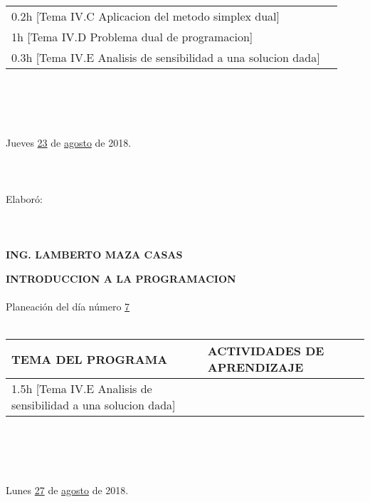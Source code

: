 \documentclass[landscape]{article}
\begin{document}
{\begin{center}
\begin{tabular}{|p{11cm}|p{8cm}|}
	0.2h	[Tema IV.C Aplicacion del metodo simplex dual]
&\\
	1h	[Tema IV.D Problema dual de programacion]
&\\
	0.3h	[Tema IV.E Analisis de sensibilidad a una solucion dada]
&\\
\hline
\end{tabular}
\ \\
\ \\
\ \\
\ \\
Jueves \underline{\hspace{0.5cm}23\hspace{0.5cm}} de  \underline{\hspace{0.5cm}agosto\hspace{0.5cm}} de 2018.
\ \\
\ \\
\ \\
\ \\
Elabor\'o:
\ \\
\ \\
\ \\
\ \\
{\bf ING. LAMBERTO MAZA CASAS}
\end{center}
\eject
\begin{center}
{\bf 
INTRODUCCION A LA PROGRAMACION
}
\ \\
\ \\
Planeaci\'on del d\'ia n\'umero \underline{\hspace{0.5cm}7\hspace{0.5cm}}
\ \\
\ \\
\begin{tabular}{|p{11cm}|p{8cm}|}\hline
{\bf TEMA DEL PROGRAMA}&{\bf ACTIVIDADES DE APRENDIZAJE}\\\hline
	1.5h	[Tema IV.E Analisis de sensibilidad a una solucion dada]
&\\
\hline
\end{tabular}
\ \\
\ \\
\ \\
\ \\
Lunes \underline{\hspace{0.5cm}27\hspace{0.5cm}} de  \underline{\hspace{0.5cm}agosto\hspace{0.5cm}} de 2018.
\ \\
\ \\
\ \\

\end{center}}
\end{document}
